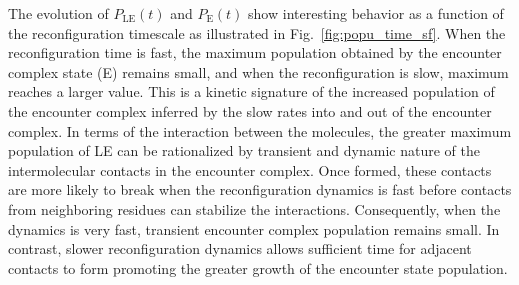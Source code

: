 \documentclass[../talant.diss.submit.tex]{subfiles}
\begin{document}
The evolution of $P_\mathrm{LE}(t)$ and $P_\mathrm{E}(t)$ show interesting behavior as a function
of the reconfiguration timescale as illustrated in  Fig.~\ref{fig:popu_time_sf}.
When the reconfiguration time is fast, the maximum population obtained by the encounter complex state
(E) remains small, and when the reconfiguration is slow, maximum reaches a larger value.
This is a kinetic signature of the increased population of the encounter complex
inferred by the slow rates into and out of the encounter complex. In terms of the
interaction between the molecules, the greater maximum population of LE can be
rationalized by transient and dynamic nature of the intermolecular contacts in
the encounter complex. Once formed, these contacts are more likely to break when
the reconfiguration dynamics is fast before contacts from neighboring residues
can stabilize the interactions. Consequently, when the dynamics is
very fast, transient encounter complex population remains small.
In contrast, slower reconfiguration dynamics allows
sufficient time for adjacent contacts to form promoting the greater growth of
the encounter state population.


\end{document}
